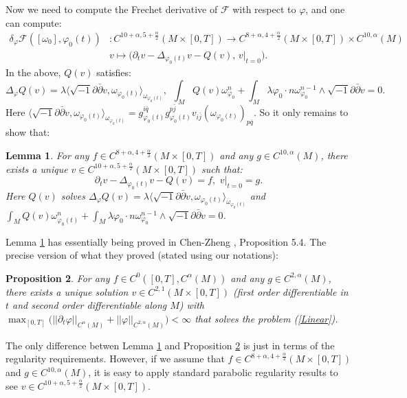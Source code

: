 \documentclass[11pt]{amsart}
\newtheorem{lem}{Lemma}[section]
\newtheorem{prop}[lem]{Proposition}
\numberwithin{equation}{section}
\begin{document}
Now we need to compute the Frechet derivative of $\mathcal{F}$ with respect to $\varphi$,  and one can compute:
\begin{equation}
\begin{split}
\delta_{\varphi}\mathcal{F}([\omega_0],\varphi_0(t))&:C^{10+\alpha,5+\frac{\alpha}{2}}(M\times [0,T])\rightarrow C^{8+\alpha,4+\frac{\alpha}{2}}(M\times [0,T])\times C^{10,\alpha}(M)\\
&v\mapsto \big(\partial_tv-\Delta_{\varphi_0(t)}v-Q(v),\,v|_{t=0}\big).
\end{split}
\end{equation}
In the above,  $Q(v)$ satisfies:
\begin{equation}
\Delta_{\varphi}Q(v)=\lambda\langle\sqrt{-1}\partial\bar{\partial}v,\omega_{\varphi_0(t)}\rangle_{\omega_{\varphi_0(t)}},\,\,\,\int_MQ(v)\omega_{\varphi_0}^n+\int_M\lambda \varphi_0\cdot n\omega_{\varphi_0}^{n-1}\wedge \sqrt{-1}\partial\bar{\partial}v=0.
\end{equation}
Here $\langle\sqrt{-1}\partial\bar{\partial}v,\omega_{\varphi_0(t)}\rangle_{\omega_{\varphi_0(t)}}=g_{\varphi_0(t)}^{i\bar{q}}g_{\varphi_0(t)}^{p\bar{j}}v_{i\bar{j}}(\omega_{\varphi_0(t)})_{p\bar{q}}$.
So it only remains to show that:
\begin{lem}\label{l6.9}
For any $f\in C^{8+\alpha,4+\frac{\alpha}{2}}(M\times [0,T])$ and any $g\in C^{10,\alpha}(M)$,  there exists a unique $v\in C^{10+\alpha,5+\frac{\alpha}{2}}(M\times [0,T])$ such that:
\begin{equation}\label{Linear}
\partial_tv-\Delta_{\varphi_0(t)}v-Q(v)=f,\,\,v|_{t=0}=g.
\end{equation}
Here $Q(v)$ solves $\Delta_{\varphi}Q(v)=\lambda\langle\sqrt{-1}\partial\bar{\partial}v,\omega_{\varphi_0(t)}\rangle_{\omega_{\varphi_0(t)}}$ and $\int_MQ(v)\omega_{\varphi_0(t)}^n+\int_M\lambda\varphi_0\cdot n\omega_{\varphi_0}^{n-1}\wedge \sqrt{-1}\partial\bar{\partial}v=0$.
\end{lem}
Lemma \ref{l6.9} has essentially being proved in Chen-Zheng \cite{Chen-Zheng},  Proposition 5.4.  The precise version of what they proved (stated using our notations):
\begin{prop}\label{p6.10}
For any $f\in C^0([0,T],C^{\alpha}(M))$ and any $g\in C^{2,\alpha}(M)$,  there exists a unique solution $v\in C^{2,1}(M\times [0,T])$ (first order differentiable in $t$ and second order differentiable along $M$) with $\max_{[0,T]}\big(||\partial_t\varphi||_{C^{\alpha}(M)}+||\varphi||_{C^{2,\alpha}(M)}\big)<\infty$ that solves the problem (\ref{Linear}).
\end{prop}
The only difference betwen Lemma \ref{l6.9} and Proposition \ref{p6.10} is just in terms of the regularity requirements.  However,  if we assume that $f\in C^{8+\alpha,4+\frac{\alpha}{2}}(M\times [0,T])$ and $g\in C^{10,\alpha}(M)$,  it is easy to apply standard parabolic regularity results to see $v\in C^{10+\alpha,5+\frac{\alpha}{2}}(M\times [0,T])$.
\end{document}
